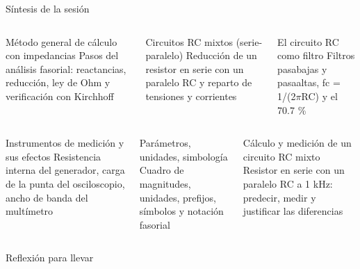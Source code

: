 \documentclass[aspectratio=169,11pt,xcolor={table}]{beamer}
\begin{document}
\begin{frame}{Síntesis de la sesión}
\begin{columns}[T,onlytextwidth]
\begin{cardB}{Método general de cálculo con impedancias}
\scriptsize Pasos del análisis fasorial: reactancias, reducción, ley de Ohm y verificación con Kirchhoff
\end{cardB}
\begin{cardO}{Circuitos RC mixtos (serie-paralelo)}
\scriptsize Reducción de un resistor en serie con un paralelo RC y reparto de tensiones y corrientes
\end{cardO}
\begin{cardG}{El circuito RC como filtro}
\scriptsize Filtros pasabajas y pasaaltas, fc = 1/(2\ensuremath{\pi}RC) y el 70.7 \%
\end{cardG}
\end{columns}
\vspace{2mm}
\begin{columns}[T,onlytextwidth]
\begin{cardB}{Instrumentos de medición y sus efectos}
\scriptsize Resistencia interna del generador, carga de la punta del osciloscopio, ancho de banda del multímetro
\end{cardB}
\begin{cardO}{Parámetros, unidades, simbología}
\scriptsize Cuadro de magnitudes, unidades, prefijos, símbolos y notación fasorial
\end{cardO}
\begin{cardG}{Cálculo y medición de un circuito RC mixto}
\scriptsize Resistor en serie con un paralelo RC a 1 kHz: predecir, medir y justificar las diferencias
\end{cardG}
\end{columns}
\end{frame}

\begin{frame}{Reflexión para llevar}
\centering
{}
\end{frame}
\end{document}
